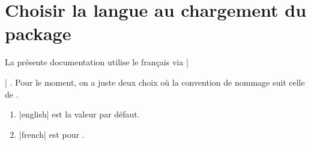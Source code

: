 \documentclass[10pt, a4paper]{article}
\begin{document}
\section{Choisir la langue au chargement du package}

La présente documentation utilise le français via \bdocinlatex|\usepackage[lang = french]{bdoc}| .
Pour le moment, on a juste deux choix où la convention de nommage suit celle de .

\begin{enumerate}
    \item \bdocinlatex|english| est la valeur par défaut.

    \item \bdocinlatex|french| est pour .
\end{enumerate}
\end{document}
